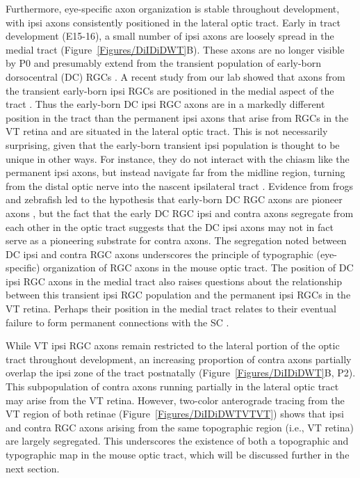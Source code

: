Furthermore, eye-specific axon organization is stable throughout development, with ipsi axons consistently positioned in the lateral optic tract.
Early in tract development (E15-16), a small number of ipsi axons are loosely spread in the medial tract (Figure~\ref{Figures/DiIDiDWT}B).
These axons are no longer visible by P0 and presumably extend from the transient population of early-born dorsocentral (DC) RGCs \cite{drager1985birth,soares2015transient}.
A recent study from our lab showed that axons from the transient early-born ipsi RGCs are positioned in the medial aspect of the tract \cite{soares2015transient}.
Thus the early-born DC ipsi RGC axons are in a markedly different position in the tract than the permanent ipsi axons that arise from RGCs in the VT retina and are situated in the lateral optic tract.
This is not necessarily surprising, given that the early-born transient ipsi population is thought to be unique in other ways.
For instance, they do not interact with the chiasm like the permanent ipsi axons, but instead navigate far from the midline region, turning from the distal optic nerve into the nascent ipsilateral tract \cite{godement1987study,godement1990retinal,marcus1995first}.
Evidence from frogs and zebrafish led to the hypothesis that early-born DC RGC axons are pioneer axons \cite{holt1984does,pittman2008pathfinding}, but the fact that the early DC RGC ipsi and contra axons segregate from each other in the optic tract \cite{soares2015transient} suggests that the DC ipsi axons may not in fact serve as a pioneering substrate for contra axons.
The segregation noted between DC ipsi and contra RGC axons underscores the principle of typographic (eye-specific) organization of RGC axons in the mouse optic tract.
The position of DC ipsi RGC axons in the medial tract also raises questions about the relationship between this transient ipsi RGC population and the permanent ipsi RGCs in the VT retina.
Perhaps their position in the medial tract relates to their eventual failure to form permanent connections with the SC \cite{soares2015transient}.

While VT ipsi RGC axons remain restricted to the lateral portion of the optic tract throughout development, an increasing proportion of contra axons partially overlap the ipsi zone of the tract postnatally (Figure~\ref{Figures/DiIDiDWT}B, P2).
This subpopulation of contra axons running partially in the lateral optic tract may arise from the VT retina.
However, two-color anterograde tracing from the VT region of both retinae (Figure~\ref{Figures/DiIDiDWTVTVT}) shows that ipsi and contra RGC axons arising from the same topographic region (i.e., VT retina) are largely segregated.
This underscores the existence of both a topographic and typographic map in the mouse optic tract, which will be discussed further in the next section.

